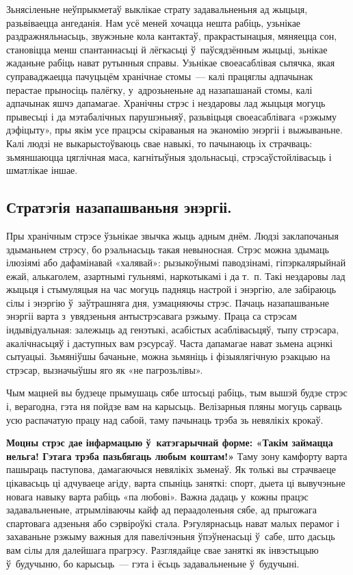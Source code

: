 
Зьнясіленьне неўпрыкметаў выклікае страту задавальненьня ад жыцьця, разьвіваецца ангеданія. Нам усё меней хочацца нешта рабіць, узьнікае раздражняльнасьць, звужэньне кола кантактаў, пракрастынацыя, мяняецца сон, становіцца менш спантаннасьці й лёгкасьці ў~паўсядзённым жыцьці, зьнікае жаданьне рабіць нават рутынныя справы. Узьнікае своеасаблівая сьпячка, якая суправаджаецца пачуцьцём хранічнае стомы~--- калі працяглы адпачынак перастае прыносіць палёгку, у~адрозьненьне ад назапашанай стомы, калі адпачынак яшчэ дапамагае. Хранічны стрэс і нездаровы лад жыцьця могуць прывесьці і да мэтабалічных парушэньняў, разьвіцьця своеасаблівага «рэжыму дэфіцыту», пры якім усе працэсы скіраваныя на эканомію энэргіі і выжываньне. Калі людзі не выкарыстоўваюць свае навыкі, то пачынаюць іх страчваць: зьмяншаюцца цяглічная маса, кагнітыўныя здольнасьці, стрэсаўстойлівасьць і шматлікае іншае.

\subsection*{Стратэгія назапашваньня энэргіі.} Пры хранічным стрэсе ўзьнікае звычка жыць адным днём. Людзі заклапочаныя здыманьнем стрэсу, бо рэальнасьць такая невыносная. Стрэс можна здымаць ілюзіямі або дафамінавай «халявай»: рызыкоўнымі паводзінамі, гіпэркалярыйнай ежай, алькаголем, азартнымі гульнямі, наркотыкамі і да т.~п. Такі нездаровы лад жыцьця і стымуляцыя на час могуць падняць настрой і энэргію, але забіраюць сілы і энэргію ў~заўтрашняга дня, узмацняючы стрэс. Пачаць назапашваньне энэргіі варта з~увядзеньня антыстрэсавага рэжыму. Праца са стрэсам індывідуальная: залежыць ад генэтыкі, асабістых асаблівасьцяў, тыпу стрэсара, акалічнасьцяў і даступных вам рэсурсаў. Часта дапамагае нават зьмена ацэнкі сытуацыі. Зьмяніўшы бачаньне, можна зьмяніць і фізыялягічную рэакцыю на стрэсар, вызначыўшы яго як «не пагрозьлівы».

Чым мацней вы будзеце прымушаць сябе штосьці рабіць, тым вышэй будзе стрэс і, верагодна, гэта ня пойдзе вам на карысьць. Велізарныя пляны могуць сарваць усю распачатую працу над сабой, таму пачынаць трэба зь невялікіх крокаў.

\textbf{Моцны стрэс дае інфармацыю ў~катэгарычнай форме: «Такім займацца нельга! Гэтага трэба пазьбягаць любым коштам!»} Таму зону камфорту варта пашыраць паступова, дамагаючыся невялікіх зьменаў. Як толькі вы страчваеце цікавасьць ці адчуваеце агіду, варта спыніць заняткі: спорт, дыета ці вывучэньне новага навыку варта рабіць «па любові». Важна дадаць у~кожны працэс задавальненьне, атрымліваючы кайф ад пераадоленьня сябе, ад прыгожага спартовага адзеньня або сэрвіроўкі стала. Рэгулярнасьць нават малых перамог і захаваньне рэжыму важныя для павелічэньня ўпэўненасьці ў~сабе, што дасьць вам сілы для далейшага прагрэсу. Разглядайце свае заняткі як інвэстыцыю ў~будучыню, бо карысьць~--- гэта і ёсьць задавальненьне ў~будучыні.

